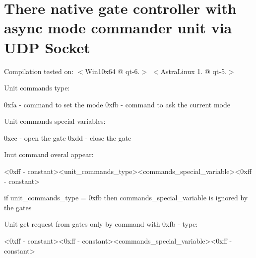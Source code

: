 \chapter{There native gate controller with async mode commander unit via UDP Socket}
\hypertarget{md_readme}{}\label{md_readme}
\label{md_readme_autotoc_md0}%
%


Compilation tested on\+: \texorpdfstring{$<$}{<}Win10x64 @ qt-\/6.\texorpdfstring{$>$}{>} \texorpdfstring{$<$}{<}Astra\+Linux 1. @ qt-\/5.\texorpdfstring{$>$}{>}

Unit commands type\+: \begin{DoxyVerb}0xfa - command to set the mode
0xfb - command to ask the current mode
\end{DoxyVerb}


Unit commands special variables\+: \begin{DoxyVerb}0xcc - open the gate
0xdd - close the gate
\end{DoxyVerb}


Inut command overal appear\+: \begin{DoxyVerb}<0xff - constant><unit_commands_type><commands_special_variable><0xff - constant>
\end{DoxyVerb}
 if unit\+\_\+commands\+\_\+type = 0xfb then commands\+\_\+special\+\_\+variable is ignored by the gates

Unit get request from gates only by command with 0xfb -\/ type\+: \begin{DoxyVerb}<0xff - constant><0xff - constant><commands_special_variable><0xff - constant>
\end{DoxyVerb}
 